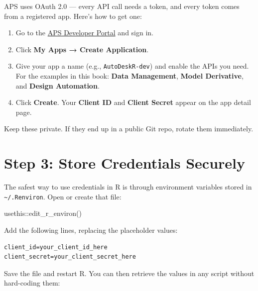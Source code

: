 \documentclass[
  11pt,
  letterpaper,
  DIV=11,
  numbers=noendperiod]{scrreprt}
\newenvironment{Shaded}{\begin{snugshade}}{\end{snugshade}}
\newcommand{\FunctionTok}[1]{\textcolor[rgb]{0.28,0.35,0.67}{#1}}
\newcommand{\NormalTok}[1]{\textcolor[rgb]{0.00,0.23,0.31}{#1}}
\newcommand{\SpecialCharTok}[1]{\textcolor[rgb]{0.37,0.37,0.37}{#1}}
\providecommand{\tightlist}{%
  \setlength{\itemsep}{0pt}\setlength{\parskip}{0pt}}
\begin{document}

APS uses OAuth 2.0 --- every API call needs a token, and every token
comes from a registered app. Here's how to get one:

\begin{enumerate}
\def\labelenumi{\arabic{enumi}.}
\tightlist
\item
  Go to the \href{https://aps.autodesk.com}{APS Developer Portal} and
  sign in.
\item
  Click \textbf{My Apps → Create Application}.
\item
  Give your app a name (e.g., \texttt{AutoDeskR-dev}) and enable the
  APIs you need. For the examples in this book: \textbf{Data
  Management}, \textbf{Model Derivative}, and \textbf{Design
  Automation}.
\item
  Click \textbf{Create}. Your \textbf{Client ID} and \textbf{Client
  Secret} appear on the app detail page.
\end{enumerate}

Keep these private. If they end up in a public Git repo, rotate them
immediately.

\section*{Step 3: Store Credentials
Securely}\label{step-3-store-credentials-securely}


The safest way to use credentials in R is through environment variables
stored in \texttt{\textasciitilde{}/.Renviron}. Open or create that
file:

\begin{Shaded}
\begin{Highlighting}[]
\NormalTok{usethis}\SpecialCharTok{::}\FunctionTok{edit\_r\_environ}\NormalTok{()}
\end{Highlighting}
\end{Shaded}

Add the following lines, replacing the placeholder values:

\begin{verbatim}
client_id=your_client_id_here
client_secret=your_client_secret_here
\end{verbatim}

Save the file and restart R. You can then retrieve the values in any
script without hard-coding them:
\end{document}
